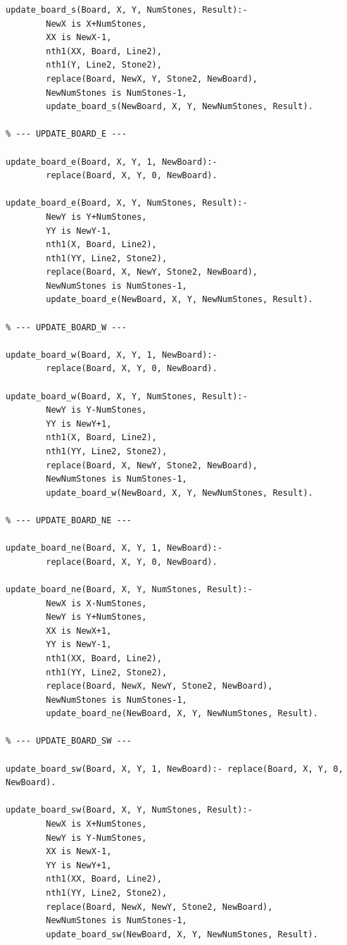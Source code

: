 \documentclass[a4paper]{article}
\begin{document}
\begin{lstlisting}
update_board_s(Board, X, Y, NumStones, Result):- 
        NewX is X+NumStones,
        XX is NewX-1,
        nth1(XX, Board, Line2),
        nth1(Y, Line2, Stone2),
        replace(Board, NewX, Y, Stone2, NewBoard), 
        NewNumStones is NumStones-1,
        update_board_s(NewBoard, X, Y, NewNumStones, Result).

% --- UPDATE_BOARD_E ---

update_board_e(Board, X, Y, 1, NewBoard):- 
        replace(Board, X, Y, 0, NewBoard).

update_board_e(Board, X, Y, NumStones, Result):- 
        NewY is Y+NumStones,
        YY is NewY-1,
        nth1(X, Board, Line2),
        nth1(YY, Line2, Stone2),
        replace(Board, X, NewY, Stone2, NewBoard), 
        NewNumStones is NumStones-1,
        update_board_e(NewBoard, X, Y, NewNumStones, Result).

% --- UPDATE_BOARD_W ---

update_board_w(Board, X, Y, 1, NewBoard):- 
        replace(Board, X, Y, 0, NewBoard).

update_board_w(Board, X, Y, NumStones, Result):- 
        NewY is Y-NumStones,
        YY is NewY+1,
        nth1(X, Board, Line2),
        nth1(YY, Line2, Stone2),
        replace(Board, X, NewY, Stone2, NewBoard), 
        NewNumStones is NumStones-1,
        update_board_w(NewBoard, X, Y, NewNumStones, Result).

% --- UPDATE_BOARD_NE ---

update_board_ne(Board, X, Y, 1, NewBoard):- 
        replace(Board, X, Y, 0, NewBoard).

update_board_ne(Board, X, Y, NumStones, Result):- 
        NewX is X-NumStones,
        NewY is Y+NumStones,
        XX is NewX+1,
        YY is NewY-1,
        nth1(XX, Board, Line2),
        nth1(YY, Line2, Stone2),
        replace(Board, NewX, NewY, Stone2, NewBoard), 
        NewNumStones is NumStones-1,
        update_board_ne(NewBoard, X, Y, NewNumStones, Result).

% --- UPDATE_BOARD_SW ---

update_board_sw(Board, X, Y, 1, NewBoard):- replace(Board, X, Y, 0, NewBoard).

update_board_sw(Board, X, Y, NumStones, Result):- 
        NewX is X+NumStones,
        NewY is Y-NumStones,
        XX is NewX-1,
        YY is NewY+1,
        nth1(XX, Board, Line2),
        nth1(YY, Line2, Stone2),
        replace(Board, NewX, NewY, Stone2, NewBoard), 
        NewNumStones is NumStones-1,
        update_board_sw(NewBoard, X, Y, NewNumStones, Result).


\end{lstlisting}
\end{document}
